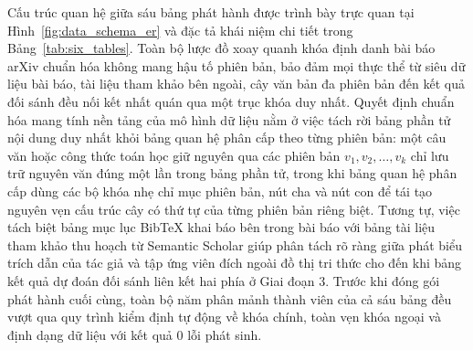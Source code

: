 Cấu trúc quan hệ giữa sáu bảng phát hành được trình bày trực quan tại Hình~\ref{fig:data_schema_er} và đặc tả khái niệm chi tiết trong Bảng~\ref{tab:six_tables}. Toàn bộ lược đồ xoay quanh khóa định danh bài báo arXiv chuẩn hóa không mang hậu tố phiên bản, bảo đảm mọi thực thể từ siêu dữ liệu bài báo, tài liệu tham khảo bên ngoài, cây văn bản đa phiên bản đến kết quả đối sánh đều nối kết nhất quán qua một trục khóa duy nhất. Quyết định chuẩn hóa mang tính nền tảng của mô hình dữ liệu nằm ở việc tách rời bảng phần tử nội dung duy nhất khỏi bảng quan hệ phân cấp theo từng phiên bản: một câu văn hoặc công thức toán học giữ nguyên qua các phiên bản $v_1, v_2, \dots, v_k$ chỉ lưu trữ nguyên văn đúng một lần trong bảng phần tử, trong khi bảng quan hệ phân cấp dùng các bộ khóa nhẹ chỉ mục phiên bản, nút cha và nút con để tái tạo nguyên vẹn cấu trúc cây có thứ tự của từng phiên bản riêng biệt. Tương tự, việc tách biệt bảng mục lục BibTeX khai báo bên trong bài báo với bảng tài liệu tham khảo thu hoạch từ Semantic Scholar giúp phân tách rõ ràng giữa phát biểu trích dẫn của tác giả và tập ứng viên đích ngoài đồ thị tri thức cho đến khi bảng kết quả dự đoán đối sánh liên kết hai phía ở Giai đoạn 3. Trước khi đóng gói phát hành cuối cùng, toàn bộ năm phân mảnh thành viên của cả sáu bảng đều vượt qua quy trình kiểm định tự động về khóa chính, toàn vẹn khóa ngoại và định dạng dữ liệu với kết quả $0$ lỗi phát sinh.

